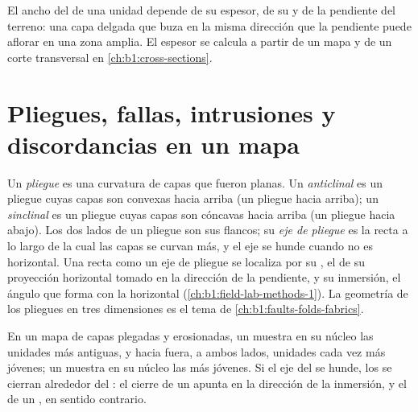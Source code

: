 \begin{remark}\label{rem:b1:geological-maps:width}
El ancho del  de una unidad depende de su espesor, de su  y de la pendiente
del terreno: una capa delgada que buza en la misma dirección que la pendiente puede aflorar en una
zona amplia. El espesor se calcula a partir de un mapa y de un corte transversal en
\cref{ch:b1:cross-sections}.
\end{remark}

\section{Pliegues, fallas, intrusiones y discordancias en un mapa}

\begin{definition}\label{def:b1:geological-maps:fold}
Un \emph{pliegue} es una curvatura de capas que fueron planas. Un
\emph{anticlinal} es un pliegue cuyas capas son convexas hacia arriba (un
pliegue hacia arriba); un \emph{sinclinal} es un pliegue cuyas capas son cóncavas
hacia arriba (un pliegue hacia abajo). Los dos lados de un pliegue son sus flancos; su
\emph{eje de pliegue} es la recta a lo largo de la cual las capas se curvan
más, y el eje se hunde cuando no es horizontal. Una recta como un eje de pliegue se localiza por su
, el  de su proyección horizontal tomado en la dirección de la pendiente, y su
inmersión, el ángulo que forma con la horizontal (\cref{ch:b1:field-lab-methods-1}). La
geometría de los pliegues en tres dimensiones es el tema de
\cref{ch:b1:faults-folds-fabrics}.
\end{definition}

\begin{proposition}\label{prop:b1:geological-maps:folds}
En un mapa de capas plegadas y erosionadas, un  muestra en su núcleo las unidades más
antiguas, y hacia fuera, a ambos lados, unidades cada vez más jóvenes; un  muestra en su
núcleo las más jóvenes. Si el eje del  se hunde, los  se cierran alrededor del
: el cierre de un  apunta en la dirección de la inmersión, y el de un , en
sentido contrario.
\end{proposition}

